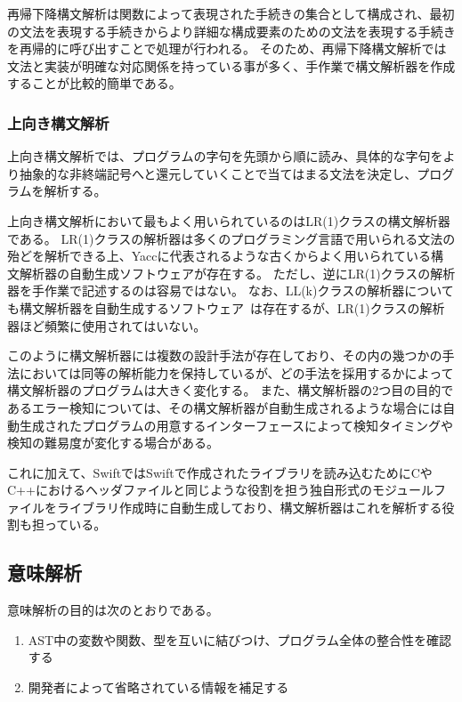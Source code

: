 再帰下降構文解析は関数によって表現された手続きの集合として構成され、最初の文法を表現する手続きからより詳細な構成要素のための文法を表現する手続きを再帰的に呼び出すことで処理が行われる。
そのため、再帰下降構文解析では文法と実装が明確な対応関係を持っている事が多く、手作業で構文解析器を作成することが比較的簡単である。

\subsubsection{上向き構文解析}

上向き構文解析では、プログラムの字句を先頭から順に読み、具体的な字句をより抽象的な非終端記号へと還元していくことで当てはまる文法を決定し、プログラムを解析する。

上向き構文解析において最もよく用いられているのはLR(1)クラスの構文解析器である。
LR(1)クラスの解析器は多くのプログラミング言語で用いられる文法の殆どを解析できる上、Yaccに代表されるような古くからよく用いられている構文解析器の自動生成ソフトウェアが存在する。
ただし、逆にLR(1)クラスの解析器を手作業で記述するのは容易ではない。
なお、LL(k)クラスの解析器についても構文解析器を自動生成するソフトウェア~\cite{antlr}は存在するが、LR(1)クラスの解析器ほど頻繁に使用されてはいない。

\vspace{2em}

このように構文解析器には複数の設計手法が存在しており、その内の幾つかの手法においては同等の解析能力を保持しているが、どの手法を採用するかによって構文解析器のプログラムは大きく変化する。
また、構文解析器の2つ目の目的であるエラー検知については、その構文解析器が自動生成されるような場合には自動生成されたプログラムの用意するインターフェースによって検知タイミングや検知の難易度が変化する場合がある。

これに加えて、SwiftではSwiftで作成されたライブラリを読み込むためにCやC++におけるヘッダファイルと同じような役割を担う独自形式のモジュールファイルをライブラリ作成時に自動生成しており、構文解析器はこれを解析する役割も担っている。

\subsection{意味解析}
\label{refinement:structure:sema}

意味解析の目的は次のとおりである。

\begin{enumerate}
    \item AST中の変数や関数、型を互いに結びつけ、プログラム全体の整合性を確認する
    \item 開発者によって省略されている情報を補足する
\end{enumerate}

